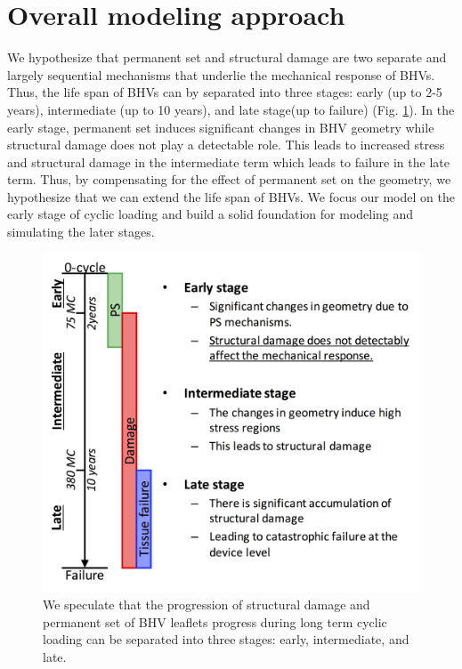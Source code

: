 \section{Overall modeling approach} \label{sec:modelapproach}

	 We hypothesize that permanent set and structural damage are two separate and largely sequential mechanisms that underlie the mechanical response of BHVs. 
	 Thus, the life span of BHVs can by separated into three stages: early (up to 2-5 years),  intermediate (up to 10 years), and late stage(up to failure) (Fig. \ref{fig:hypothesis}). 
	 In the early stage, permanent set induces significant changes in BHV geometry while structural damage does not play a detectable role. 
	 This leads to increased stress and structural damage in the intermediate term which leads to failure in the late term. 
	 Thus, by compensating for the effect of permanent set on the geometry, we hypothesize that we can extend the life span of BHVs. 
	 We focus our model on the early stage of cyclic loading and build a solid foundation for modeling and simulating the later stages.
	 
\begin{figure}[hbt]
\centering
\includegraphics[width=0.4\paperwidth]{Images/chapter4/figure2}
\caption{We speculate that the progression of structural damage and permanent set of BHV leaflets progress during long term cyclic loading can be separated into three stages: early, intermediate, and late.}
\label{fig:hypothesis}
\end{figure}

